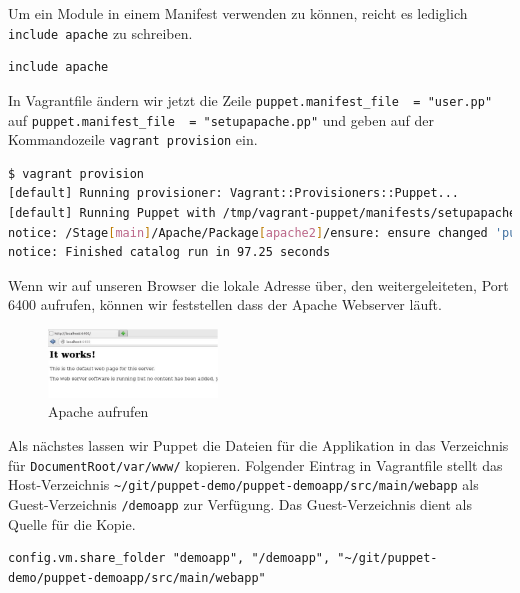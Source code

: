 \documentclass[12pt,a4paper,ngerman]{article}
\begin{document}
Um ein Module in einem Manifest verwenden zu können, reicht es lediglich \lstinline$include apache$ zu schreiben.
\begin{lstlisting}[language=puppet,caption=Inhalt von manifests/setupapache.pp, label=setupapache.pp]
include apache
\end{lstlisting}

In Vagrantfile ändern wir jetzt die Zeile \lstinline$puppet.manifest_file  = "user.pp"$ auf \lstinline$puppet.manifest_file  = "setupapache.pp"$ und geben auf der Kommandozeile \lstinline$vagrant provision$ ein.

\begin{lstlisting}[language=sh,caption=vagrant provisioning für Apache, label=provisioning_apache]
$ vagrant provision
[default] Running provisioner: Vagrant::Provisioners::Puppet...
[default] Running Puppet with /tmp/vagrant-puppet/manifests/setupapache.pp...
notice: /Stage[main]/Apache/Package[apache2]/ensure: ensure changed 'purged' to 'present'
notice: Finished catalog run in 97.25 seconds
\end{lstlisting}

Wenn wir auf unseren Browser die lokale Adresse über, den weitergeleiteten, Port 6400 aufrufen, können wir feststellen dass der Apache Webserver läuft.
\begin{figure}
  \begin{center}
    \includegraphics[width=0.4\textwidth]{images/apache.pdf}
  \end{center}
  \caption{Apache aufrufen}
  \label{apache}
\end{figure}

Als nächstes lassen wir Puppet die Dateien für die Applikation in das Verzeichnis für \lstinline$DocumentRoot/var/www/$ kopieren. Folgender Eintrag in Vagrantfile stellt das Host-Verzeichnis \lstinline$~/git/puppet-demo/puppet-demoapp/src/main/webapp$ als Guest-Verzeichnis \lstinline$/demoapp$ zur Verfügung. Das Guest-Verzeichnis dient als Quelle für die Kopie.
\begin{lstlisting}[language=vagrant,caption=Shared folders in Vagrantfile konfigurieren, label=vagrantsharedfolder]
config.vm.share_folder "demoapp", "/demoapp", "~/git/puppet-demo/puppet-demoapp/src/main/webapp"
\end{lstlisting}
\end{document}
